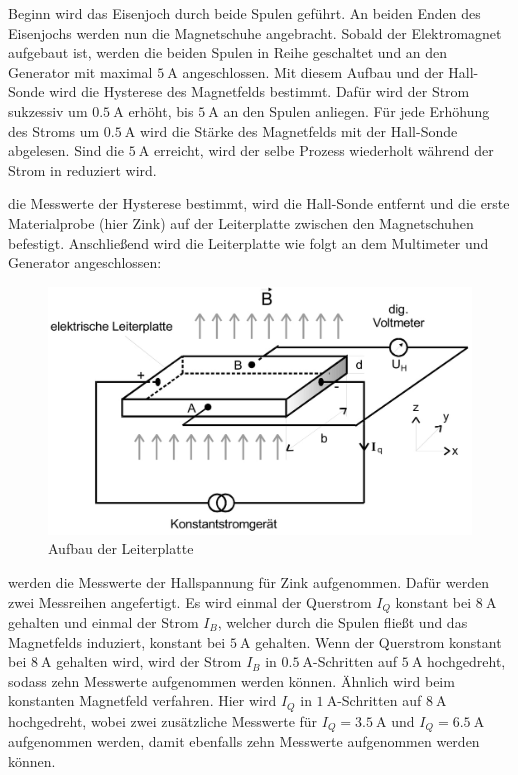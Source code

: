 \justifying Beginn wird das Eisenjoch durch beide Spulen geführt. An beiden Enden des Eisenjochs werden nun die Magnetschuhe
angebracht. Sobald der Elektromagnet aufgebaut ist, werden die beiden Spulen in Reihe geschaltet und an den Generator mit maximal 
$\SI{5}{\ampere}$ angeschlossen. Mit diesem Aufbau und der Hall-Sonde wird die Hysterese des Magnetfelds bestimmt. Dafür wird der Strom sukzessiv 
um $\SI{0.5}{\ampere}$ erhöht, bis $\SI{5}{\ampere}$ an den Spulen anliegen. Für jede Erhöhung des Stroms um $\SI{0.5}{\ampere}$ wird die Stärke
des Magnetfelds mit der Hall-Sonde abgelesen. Sind die $\SI{5}{\ampere}$ erreicht, wird der selbe Prozess wiederholt während der Strom in reduziert
wird. 

\justifying die Messwerte der Hysterese bestimmt, wird die Hall-Sonde entfernt und die erste Materialprobe (hier Zink) auf der 
Leiterplatte zwischen den Magnetschuhen befestigt. Anschließend wird die Leiterplatte wie folgt an dem Multimeter und Generator angeschlossen:

\begin{figure}[H]
    \centering
    \includegraphics[width=\linewidth]{./images/leiterplatte.jpg}
    \caption{Aufbau der Leiterplatte \cite{V311}}
    \label{fig:1}
\end{figure}

\justifying werden die Messwerte der Hallspannung für Zink aufgenommen. Dafür werden zwei Messreihen angefertigt. Es wird einmal 
der Querstrom $I_Q$ konstant bei $\SI{8}{\ampere}$ gehalten und einmal der Strom $I_B$, welcher durch die Spulen fließt und das Magnetfelds
induziert, konstant bei $\SI{5}{\ampere}$ gehalten. Wenn der Querstrom konstant bei $\SI{8}{\ampere}$ gehalten wird, wird der Strom $I_B$ in 
$\SI{0.5}{\ampere}$-Schritten auf $\SI{5}{\ampere}$ hochgedreht, sodass zehn Messwerte aufgenommen werden können. Ähnlich wird beim konstanten
Magnetfeld verfahren. Hier wird $I_Q$ in $\SI{1}{\ampere}$-Schritten auf $\SI{8}{\ampere}$ hochgedreht, wobei zwei zusätzliche Messwerte für 
$I_Q = \SI{3.5}{\ampere}$ und $I_Q = \SI{6.5}{\ampere}$ aufgenommen werden, damit ebenfalls zehn Messwerte aufgenommen werden können. 

